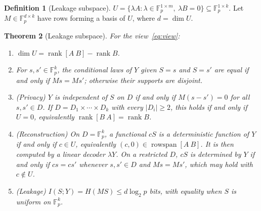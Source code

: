 \documentclass[pdflatex,sn-mathphys-num]{sn-jnl}
\theoremstyle{plain}
\newtheorem{theorem}{Theorem}
\theoremstyle{definition}
\newtheorem{definition}[theorem]{Definition}
\newcommand{\F}{\mathbb{F}}
\newcommand{\rk}{\operatorname{rank}}
\begin{document}
\begin{definition}[Leakage subspace]
$U=\{\lambda A:\lambda\in\F_p^{1\times m},\ \lambda B=0\}\subseteq\F_p^{1\times k}$. Let $M\in\F_p^{d\times k}$ have rows forming a basis of $U$, where $d=\dim U$.
\end{definition}

\begin{keyresult}
\begin{theorem}[Leakage subspace]\label{thm:leakage}
For the view~\eqref{eq:view}:
\begin{enumerate}
\item $\dim U=\rk[A\ B]-\rk B$.
\item For $s,s'\in\F_p^k$, the conditional laws of $Y$ given $S=s$ and $S=s'$ are equal if and only if $Ms=Ms'$; otherwise their supports are disjoint.
\item (Privacy) $Y$ is independent of $S$ on $D$ if and only if $M(s-s')=0$ for all $s,s'\in D$. If $D=D_1\times\cdots\times D_k$ with every $|D_i|\ge2$, this holds if and only if $U=0$, equivalently $\rk[B\ A]=\rk B$.
\item (Reconstruction) On $D=\F_p^k$, a functional $cS$ is a deterministic function of $Y$ if and only if $c\in U$, equivalently $(c,0)\in\operatorname{rowspan}[A\ B]$. It is then computed by a linear decoder $\lambda Y$. On a restricted $D$, $cS$ is determined by $Y$ if and only if $cs=cs'$ whenever $s,s'\in D$ and $Ms=Ms'$, which may hold with $c\notin U$.
\item (Leakage) $I(S;Y)=H(MS)\le d\log_2p$ bits, with equality when $S$ is uniform on $\F_p^k$.
\end{enumerate}
\end{theorem}
\end{keyresult}
\end{document}
